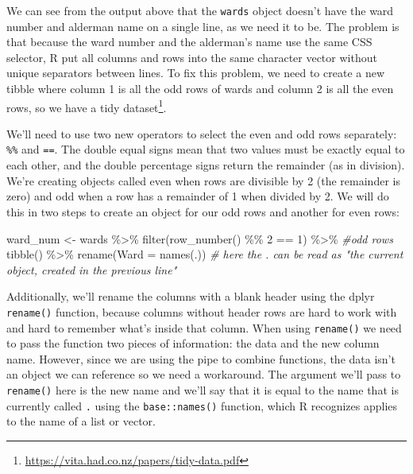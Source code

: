 \documentclass[
  krantz2]{krantz}
\makeatletter
\newenvironment{Shaded}{\begin{snugshade}}{\end{snugshade}}
\newcommand{\AttributeTok}[1]{\textcolor[rgb]{0.61,0.61,0.61}{#1}}
\newcommand{\CommentTok}[1]{\textcolor[rgb]{0.37,0.37,0.37}{\textit{#1}}}
\newcommand{\DecValTok}[1]{\textcolor[rgb]{0.06,0.06,0.06}{#1}}
\newcommand{\FunctionTok}[1]{\textcolor[rgb]{0,0,0}{#1}}
\newcommand{\NormalTok}[1]{#1}
\newcommand{\OtherTok}[1]{\textcolor[rgb]{0.37,0.37,0.37}{#1}}
\newcommand{\SpecialCharTok}[1]{\textcolor[rgb]{0,0,0}{#1}}
\newenvironment{kframe}{%
\medskip{}
\setlength{\fboxsep}{.8em}
 \def\at@end@of@kframe{}%
 \ifinner\ifhmode%
  \def\at@end@of@kframe{\end{minipage}}%
  \begin{minipage}{\columnwidth}%
 \fi\fi%
 \def\FrameCommand##1{\hskip\@totalleftmargin \hskip-\fboxsep
 \colorbox{shadecolor}{##1}\hskip-\fboxsep
     \hskip-\linewidth \hskip-\@totalleftmargin \hskip\columnwidth}%
 \MakeFramed {\advance\hsize-\width
   \@totalleftmargin\z@ \linewidth\hsize
   \@setminipage}}%
 {\par\unskip\endMakeFramed%
 \at@end@of@kframe}
\renewenvironment{Shaded}{\begin{kframe}}{\end{kframe}}
\makeatother
\begin{document}
We can see from the output above that the \texttt{wards} object doesn't have the ward number and alderman name on a single line, as we need it to be. The problem is that because the ward number and the alderman's name use the same CSS selector, R put all columns and rows into the same character vector without unique separators between lines. To fix this problem, we need to create a new tibble where column 1 is all the odd rows of wards and column 2 is all the even rows, so we have a tidy dataset\footnote{\url{https://vita.had.co.nz/papers/tidy-data.pdf}}.

We'll need to use two new operators to select the even and odd rows separately: \texttt{\%\%} and \texttt{==}. The double equal signs mean that two values must be exactly equal to each other, and the double percentage signs return the remainder (as in division). We're creating objects called even when rows are divisible by 2 (the remainder is zero) and odd when a row has a remainder of 1 when divided by 2. We will do this in two steps to create an object for our odd rows and another for even rows:

\begin{Shaded}
\begin{Highlighting}[]
\NormalTok{ward\_num }\OtherTok{\textless{}{-}}\NormalTok{ wards }\SpecialCharTok{\%\textgreater{}\%}
  \FunctionTok{filter}\NormalTok{(}\FunctionTok{row\_number}\NormalTok{() }\SpecialCharTok{\%\%} \DecValTok{2} \SpecialCharTok{==} \DecValTok{1}\NormalTok{) }\SpecialCharTok{\%\textgreater{}\%} \CommentTok{\#odd rows}
  \FunctionTok{tibble}\NormalTok{() }\SpecialCharTok{\%\textgreater{}\%}
  \FunctionTok{rename}\NormalTok{(}\AttributeTok{Ward =} \FunctionTok{names}\NormalTok{(.)) }\CommentTok{\# here the \textquotesingle{}.\textquotesingle{} can be read as "the current object, created in the previous line"}
\end{Highlighting}
\end{Shaded}

Additionally, we'll rename the columns with a blank header using the dplyr \texttt{rename()} function, because columns without header rows are hard to work with and hard to remember what's inside that column. When using \texttt{rename()} we need to pass the function two pieces of information: the data and the new column name. However, since we are using the pipe to combine functions, the data isn't an object we can reference so we need a workaround. The argument we'll pass to \texttt{rename()} here is the new name and we'll say that it is equal to the name that is currently called \texttt{.} using the \texttt{base::names()} function, which R recognizes applies to the name of a list or vector.
\end{document}

